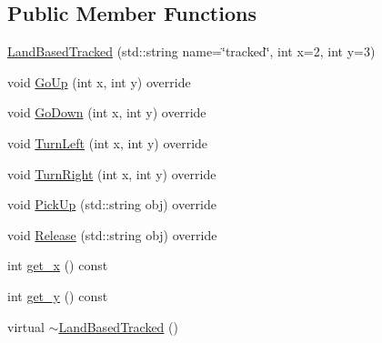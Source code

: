 \subsection*{Public Member Functions}
\begin{DoxyCompactItemize}
\item 
\hyperlink{classrwa3_1_1_land_based_tracked_a7afa1f901374a08d0bb23882988eef46}{Land\+Based\+Tracked} (std\+::string name=\char`\"{}tracked\char`\"{}, int x=2, int y=3)
\item 
void \hyperlink{classrwa3_1_1_land_based_tracked_a36d32a38c1c7cf44c5d7aebeb18f79ff}{Go\+Up} (int x, int y) override
\item 
void \hyperlink{classrwa3_1_1_land_based_tracked_a1258bb7873abc517913e84e33effd6c4}{Go\+Down} (int x, int y) override
\item 
void \hyperlink{classrwa3_1_1_land_based_tracked_a6f8d74079ad047edd9f17cc541eafa86}{Turn\+Left} (int x, int y) override
\item 
void \hyperlink{classrwa3_1_1_land_based_tracked_a5f6a5b1871d9f75d8a724b8d7ae44d1f}{Turn\+Right} (int x, int y) override
\item 
void \hyperlink{classrwa3_1_1_land_based_tracked_af1e65be827430cd9281e982409ebedcb}{Pick\+Up} (std\+::string obj) override
\item 
void \hyperlink{classrwa3_1_1_land_based_tracked_a89dbcac8ec2fd64c6b168167cd6363a4}{Release} (std\+::string obj) override
\item 
int \hyperlink{classrwa3_1_1_land_based_tracked_a9065f381181bef7d8a4c8f4061ef2cda}{get\+\_\+x} () const
\item 
int \hyperlink{classrwa3_1_1_land_based_tracked_a11025bced4da296a2207e169fe328857}{get\+\_\+y} () const
\item 
virtual \hyperlink{classrwa3_1_1_land_based_tracked_a018639eac0eabfcf86fc2b48e0b6df83}{$\sim$\+Land\+Based\+Tracked} ()
\end{DoxyCompactItemize}
